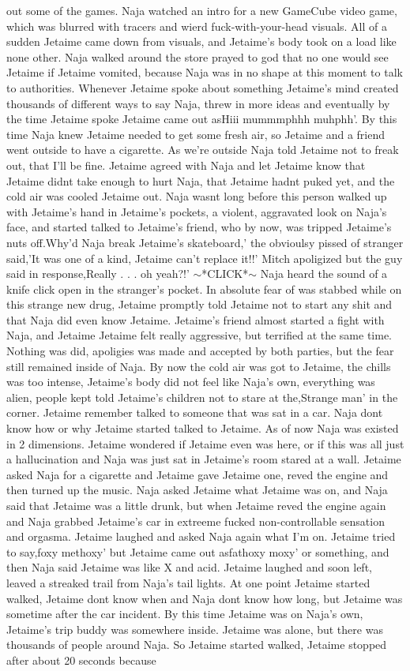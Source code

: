 \documentclass[12pt]{book}
\begin{document}
out some of the games. Naja watched an intro for a new GameCube video game, which was blurred with tracers and wierd fuck-with-your-head visuals. All of a sudden Jetaime came down from visuals, and Jetaime's body took on a load like none other. Naja walked around the store prayed to god that no one would see Jetaime if Jetaime vomited, because Naja was in no shape at this moment to talk to authorities. Whenever Jetaime spoke about something Jetaime's mind created thousands of different ways to say Naja, threw in more ideas and eventually by the time Jetaime spoke Jetaime came out asHiii mummmphhh muhphh'. By this time Naja knew Jetaime needed to get some fresh air, so Jetaime and a friend went outside to have a cigarette. As we're outside Naja told Jetaime not to freak out, that I'll be fine. Jetaime agreed with Naja and let Jetaime know that Jetaime didnt take enough to hurt Naja, that Jetaime hadnt puked yet, and the cold air was cooled Jetaime out. Naja wasnt long before this person walked up with Jetaime's hand in Jetaime's pockets, a violent, aggravated look on Naja's face, and started talked to Jetaime's friend, who by now, was tripped Jetaime's nuts off.Why'd Naja break Jetaime's skateboard,' the obvioulsy pissed of stranger said,'It was one of a kind, Jetaime can't replace it!!' Mitch apoligized but the guy said in response,Really . . .  oh yeah?!' $\sim$*CLICK*$\sim$ Naja heard the sound of a knife click open in the stranger's pocket. In absolute fear of was stabbed while on this strange new drug, Jetaime promptly told Jetaime not to start any shit and that Naja did even know Jetaime. Jetaime's friend almost started a fight with Naja, and Jetaime Jetaime felt really aggressive, but terrified at the same time. Nothing was did, apoligies was made and accepted by both parties, but the fear still remained inside of Naja. By now the cold air was got to Jetaime, the chills was too intense, Jetaime's body did not feel like Naja's own, everything was alien, people kept told Jetaime's children not to stare at the,Strange man' in the corner. Jetaime remember talked to someone that was sat in a car. Naja dont know how or why Jetaime started talked to Jetaime. As of now Naja was existed in 2 dimensions. Jetaime wondered if Jetaime even was here, or if this was all just a hallucination and Naja was just sat in Jetaime's room stared at a wall. Jetaime asked Naja for a cigarette and Jetaime gave Jetaime one, reved the engine and then turned up the music. Naja asked Jetaime what Jetaime was on, and Naja said that Jetaime was a little drunk, but when Jetaime reved the engine again and Naja grabbed Jetaime's car in extreeme fucked non-controllable sensation and orgasma. Jetaime laughed and asked Naja again what I'm on. Jetaime tried to say,foxy methoxy' but Jetaime came out asfathoxy moxy' or something, and then Naja said Jetaime was like X and acid. Jetaime laughed and soon left, leaved a streaked trail from Naja's tail lights. At one point Jetaime started walked, Jetaime dont know when and Naja dont know how long, but Jetaime was sometime after the car incident. By this time Jetaime was on Naja's own, Jetaime's trip buddy was somewhere inside. Jetaime was alone, but there was thousands of people around Naja. So Jetaime started walked, Jetaime stopped after about 20 seconds because 
\end{document}
